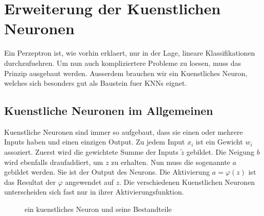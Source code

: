 \section{Erweiterung der Kuenstlichen Neuronen}\label{sec:kuenstlicheNeuronen}
Ein Perzeptron ist, wie vorhin erklaert, nur in der Lage, lineare Klassifikationen
durchzufuehren. Um nun auch kompliziertere Probleme zu loesen, muss das Prinzip
ausgebaut werden. Ausserdem brauchen wir ein Kuenstliches Neuron, welches sich
besonders gut als Baustein fuer KNNs eignet.


\subsection{Kuenstliche Neuronen im Allgemeinen}
Kuenstliche Neuronen sind immer so aufgebaut, dass sie einen oder mehrere Inputs
haben und einen einzigen Output. Zu jedem Input $x_i$ ist ein Gewicht
$w_{i}$ assoziert. Zuerst wird die gewichtete Summe der Inputs $\tilde{z}$ gebildet.
Die Neigung $b$ wird ebenfalls draufaddiert, um $z$ zu erhalten. Nun muss
die sogenannte  $a$ gebildet werden. Sie ist der Output des Neurons.
Die Aktivierung $a = \varphi(z)$ ist das Resultat der  $\varphi$ angewendet
auf $z$. Die verschiedenen Kuenstlichen Neuronen unterscheiden
sich fast nur in ihrer Aktivierungsfunktion.
\\
\begin{figure}[h!]

  \caption{ein kuenstliches Neuron und seine Bestandteile}
\end{figure}
\\

